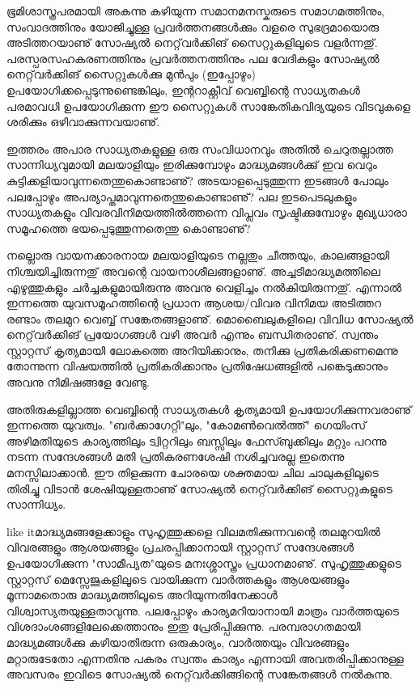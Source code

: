 ഭൂമിശാസ്ത്രപരമായി അകന്നു കഴിയുന്ന സമാനമനസ്കരുടെ സമാഗമത്തിനും, സംവാദത്തിനും യോജിച്ചുള്ള പ്രവര്‍ത്തനങ്ങള്‍ക്കും 
വളരെ സുഭദ്രമായൊരു അടിത്തറയാണു് സോഷ്യല്‍ നെറ്റ്‌വര്‍ക്കിങ് സൈറ്റുകളിലൂടെ വളര്‍ന്നതു്. പരസ്പരസഹകരണത്തിനും 
പ്രവര്‍ത്തനത്തിനും പല വേദികളും സോഷ്യല്‍ നെറ്റ്‌വര്‍ക്കിങ് സൈറ്റുകള്‍ക്കു മുന്‍പും (ഇപ്പോഴും) ഉപയോഗിക്കപ്പെടുന്നുണ്ടെങ്കിലും, 
ഇന്ററാക്റ്റീവ് വെബ്ബിന്റെ സാധ്യതകള്‍ പരമാവധി ഉപയോഗിക്കുന്ന ഈ സൈറ്റുകള്‍ സാങ്കേതികവിദ്യയുടെ വിടവുകളെ ശരിക്കും 
ഒഴിവാക്കുന്നവയാണു്.

ഇത്തരം അപാര സാധ്യതകളുള്ള ഒരു സംവിധാനവും അതില്‍ ചെറുതല്ലാത്ത സാന്നിധ്യവുമായി മലയാളിയും ഇരിക്കുമ്പോഴും 
മാദ്ധ്യമങ്ങള്‍ക്കു് ഇവ വെറും കുട്ടിക്കളിയാവുന്നതെന്തുകൊണ്ടാണു്? അടയാളപ്പെടുത്തുന്ന ഇടങ്ങള്‍ പോലും പലപ്പോഴും 
അപര്യാപ്തമാവുന്നതെന്തുകൊണ്ടാണു്? പല ഇടപെടലുകളും സാധ്യതകളും വിവരവിനിമയത്തില്‍ത്തന്നെ വിപ്ലവം സൃഷ്ടിക്കുമ്പോഴും 
മുഖ്യധാരാ സമൂഹത്തെ ഭയപ്പെടുത്തുന്നതെന്തു കൊണ്ടാണു്?

നല്ലൊരു വായനക്കാരനായ മലയാളിയുടെ നല്ലതും ചീത്തയും, കാലങ്ങളായി നിശ്ചയിച്ചിരുന്നതു് അവന്റെ വായനാശീലങ്ങളാണു്.
 അച്ചടിമാദ്ധ്യമത്തിലെ എഴുത്തുകളും ചര്‍ച്ചകളുമായിരുന്നു അവനു വെളിച്ചം നല്‍കിയിരുന്നതു്. എന്നാല്‍ ഇന്നത്തെ 
യുവസമൂഹത്തിന്റെ പ്രധാന ആശയ/വിവര വിനിമയ അടിത്തറ രണ്ടാം തലമുറ വെബ്ബ് സങ്കേതങ്ങളാണു്. മൊബൈലുകളിലെ 
വിവിധ സോഷ്യല്‍ നെറ്റ്‌വര്‍ക്കിങ് പ്രയോഗങ്ങള്‍ വഴി അവര്‍ എന്നും ബന്ധിതരാണു്. സ്വന്തം സ്റ്റാറ്റസ് കൃത്യമായി ലോകത്തെ 
അറിയിക്കാനും, തനിക്കു പ്രതികരിക്കണമെന്നു തോന്നുന്ന വിഷയത്തില്‍ പ്രതികരിക്കാനും പ്രതിഷേധങ്ങളില്‍ പങ്കെടുക്കാനും അവനു 
നിമിഷങ്ങളേ വേണ്ടു.

അതിരുകളില്ലാത്ത വെബ്ബിന്റെ സാധ്യതകള്‍ കൃത്യമായി ഉപയോഗിക്കുന്നവരാണു് ഇന്നത്തെ യുവത്വം. "ബര്‍ക്കാഗേറ്റി"ലും, 
"കോമണ്‍വെല്‍ത്ത്" ഗെയിംസ് അഴിമതിയുടെ കാര്യത്തിലും ട്വിറ്ററിലും ബസ്സിലും ഫേസ്ബുക്കിലും മറ്റും പറന്നു നടന്ന സന്ദേശങ്ങള്‍ 
മതി പ്രതികരണശേഷി നശിച്ചവരല്ല ഇതെന്നു മനസ്സിലാക്കാന്‍. ഈ തിളക്കുന്ന ചോരയെ ശക്തമായ ചില ചാലുകളിലൂടെ തിരിച്ചു 
വിടാന്‍ ശേഷിയുള്ളതാണു് സോഷ്യല്‍ നെറ്റ്‌വര്‍ക്കിങ് സൈറ്റുകളുടെ സാന്നിധ്യം.

like itമാദ്ധ്യമങ്ങളേക്കാളും സുഹൃത്തുക്കളെ വിലമതിക്കുന്നവന്റെ തലമുറയില്‍ വിവരങ്ങളും ആശയങ്ങളും പ്രചരപ്പിക്കാനായി 
സ്റ്റാറ്റസ് സന്ദേശങ്ങള്‍ ഉപയോഗിക്കുന്ന "സാമീപ്യത"യുടെ മനഃശ്ശാസ്ത്രം പ്രധാനമാണു്. സുഹൃത്തുക്കളുടെ സ്റ്റാറ്റസ് മെസ്സേജുകളിലൂടെ 
വായിക്കുന്ന വാര്‍ത്തകളും ആശയങ്ങളും മൂന്നാമതൊരു മാദ്ധ്യമത്തിലൂടെ അറിയുന്നതിനേക്കാള്‍ വിശ്വാസ്യതയുള്ളതാവുന്നു. 
പലപ്പോഴും കാര്യമറിയാനായി മാത്രം വാര്‍ത്തയുടെ വിശദാംശങ്ങളിലേക്കെത്താനും ഇതു പ്രേരിപ്പിക്കുന്നു. പരമ്പരാഗതമായി 
മാദ്ധ്യമങ്ങള്‍ക്കു കഴിയാതിരുന്ന ഒരുകാര്യം, വാര്‍ത്തയും വിവരങ്ങളും മറ്റാരുടേതോ എന്നതിനു പകരം സ്വന്തം കാര്യം എന്നായി
 അവതരിപ്പിക്കാനുള്ള അവസരം ഇവിടെ സോഷ്യല്‍ നെറ്റ്‌വര്‍ക്കിങ്ങിന്റെ സങ്കേതങ്ങള്‍ നല്‍കുന്നു.

